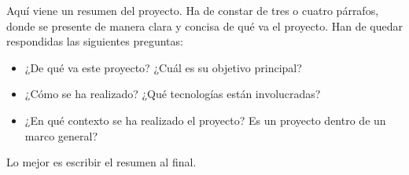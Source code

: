 \documentclass[a4paper, 12pt]{book}
\begin{document}
Aqu\'i viene un resumen del proyecto. Ha de constar de tres o cuatro p\'arrafos, donde se presente de manera clara y concisa de qu\'e va el proyecto.
Han de quedar respondidas las siguientes preguntas:

\begin{itemize}
  \item¿De qu\'e va este proyecto? ¿Cu\'al es su objetivo principal?
  \item¿C\'omo se ha realizado? ¿Qu\'e tecnolog\'ias est\'an involucradas?
  \item¿En qu\'e contexto se ha realizado el proyecto? Es un proyecto
dentro de un marco general?
\end{itemize}

Lo mejor es escribir el resumen al final.


%



\tableofcontents
\cleardoublepage
\listoffigures %


\end{document}
